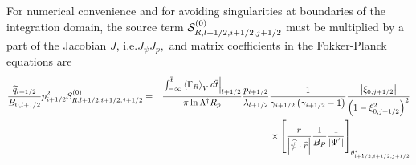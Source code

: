 For numerical convenience and for avoiding singularities at boundaries of
the integration domain, the source term $\mathcal{S}_{R,l+1/2,i+1/2,j+1/2}^{%
\left( 0\right) }$ must be multiplied by a part of the Jacobian $J$, i.e.$%
J_{\psi }J_{p},$ and matrix coefficients in the Fokker-Planck equations are 
\begin{eqnarray}
\frac{\widetilde{q}_{l+1/2}}{B_{0,l+1/2}}p_{i+1/2}^{2}\mathcal{S}%
_{R,l+1/2,i+1/2,j+1/2}^{\left( 0\right) } &=&\frac{\left. \int_{-\infty }^{%
\overline{t}}\left\langle \Gamma _{R}\right\rangle _{V}d\overline{t}\right|
_{l+1/2}}{\pi \ln \Lambda ^{\dag }R_{p}}\frac{p_{i+1/2}}{\lambda _{l+1/2}}%
\frac{1}{\gamma _{i+1/2}\left( \gamma _{i+1/2}-1\right) }\frac{\left| \xi
_{0,j+1/2}\right| }{\left( 1-\xi _{0,j+1/2}^{2}\right) ^{2}}  \notag \\
&&\times \left[ \frac{r}{\left| \widehat{\psi }\cdot \widehat{r}\right| }%
\frac{1}{B_{P}}\frac{1}{\left| \Psi ^{^{\prime }}\right| }\right] _{\theta
_{l+1/2,i+1/2,j+1/2}^{*}}
\end{eqnarray}
